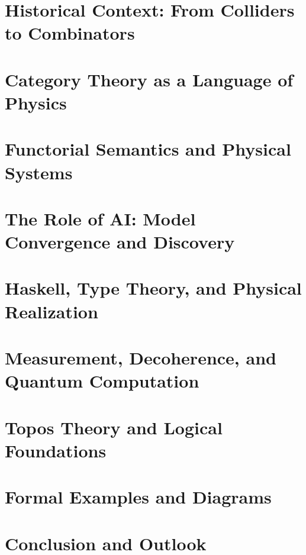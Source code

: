 \documentclass[11pt,a4paper]{article}
\begin{document}
\section{Historical Context: From Colliders to Combinators}


\section{Category Theory as a Language of Physics}


\section{Functorial Semantics and Physical Systems}


\section{The Role of AI: Model Convergence and Discovery}


\section{Haskell, Type Theory, and Physical Realization}


\section{Measurement, Decoherence, and Quantum Computation}


\section{Topos Theory and Logical Foundations}


\section{Formal Examples and Diagrams}


\section{Conclusion and Outlook}




\end{document}
